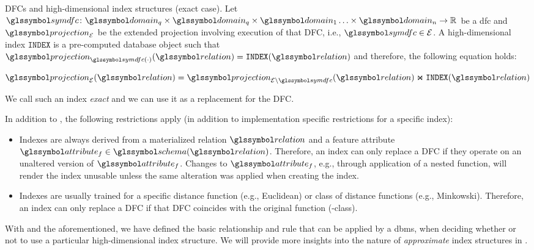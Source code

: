\begin{definition}[label=definition:dfc_and_index]{DFCs and high-dimensional index structures (exact case).}{}
    Let $\symdfc \colon \domain_q \times \domain_q \times \domain_{1} \ldots \times \domain_{n} \to \mathbb{R}$ be a \acrshort{dfc} and $\projection_{\mathcal{E}}$ be the extended projection involving execution of that DFC, i.e., $\symdfc \in \mathcal{E}$. A high-dimensional index $\mathtt{INDEX}$ is a pre-computed database object such that $\projection_{\symdfc(\cdot)}(\relation) = \mathtt{INDEX}(\relation)$ and therefore, the following equation holds:

    \begin{equation*}
        \projection_{\mathcal{E}} (\relation) = \projection_{\mathcal{E} \setminus \symdfc} (\relation) \Join \mathtt{INDEX} (\relation)
    \end{equation*}
    
    We call such an index \emph{exact} and we can use it as a replacement for the DFC.
\end{definition}

In addition to , the following restrictions apply (in addition to implementation specific restrictions for a specific index):

\begin{itemize}
    \item Indexes are always derived from a materialized relation $\relation$ and a feature attribute 
    $\attribute_f \in \schema(\relation)$. Therefore, an index can only replace a DFC if they operate on an unaltered version of $\attribute_f$. Changes to $\attribute_f$, e.g., through application of a nested function, will render the index unusable unless the same alteration was applied when creating the index.
    \item Indexes are usually trained for a specific distance function (e.g., Euclidean) or class of distance functions (e.g., Minkowski). Therefore, an index can only replace a DFC if that DFC coincides with the original function (-class).
\end{itemize}

With  and the aforementioned, we have defined the basic relationship and rule that can be applied by a \acrshort{dbms}, when deciding whether or not to use a particular high-dimensional index structure. We will provide more insights into the nature of \emph{approximate} index structures in .

